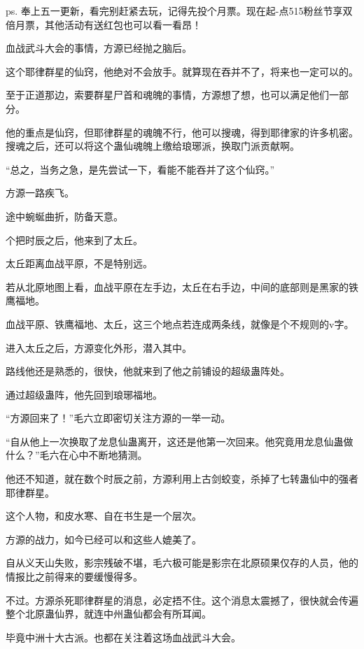 
\begin{this_body}

ps. 奉上五一更新，看完别赶紧去玩，记得先投个月票。现在起-点515粉丝节享双倍月票，其他活动有送红包也可以看一看昂！

血战武斗大会的事情，方源已经抛之脑后。

这个耶律群星的仙窍，他绝对不会放手。就算现在吞并不了，将来也一定可以的。

至于正道那边，索要群星尸首和魂魄的事情，方源想了想，也可以满足他们一部分。

他的重点是仙窍，但耶律群星的魂魄不行，他可以搜魂，得到耶律家的许多机密。搜魂之后，还可以将这个蛊仙魂魄上缴给琅琊派，换取门派贡献啊。

“总之，当务之急，是先尝试一下，看能不能吞并了这个仙窍。”

方源一路疾飞。

途中蜿蜒曲折，防备天意。

个把时辰之后，他来到了太丘。

太丘距离血战平原，不是特别远。

若从北原地图上看，血战平原在左手边，太丘在右手边，中间的底部则是黑家的铁鹰福地。

血战平原、铁鹰福地、太丘，这三个地点若连成两条线，就像是个不规则的v字。

进入太丘之后，方源变化外形，潜入其中。

路线他还是熟悉的，很快，他就来到了他之前铺设的超级蛊阵处。

通过超级蛊阵，他先回到琅琊福地。

“方源回来了！”毛六立即密切关注方源的一举一动。

“自从他上一次换取了龙息仙蛊离开，这还是他第一次回来。他究竟用龙息仙蛊做什么？”毛六在心中不断地猜测。

他还不知道，就在数个时辰之前，方源利用上古剑蛟变，杀掉了七转蛊仙中的强者耶律群星。

这个人物，和皮水寒、自在书生是一个层次。

方源的战力，如今已经可以和这些人媲美了。

自从义天山失败，影宗残破不堪，毛六极可能是影宗在北原硕果仅存的人员，他的情报比之前得来的要缓慢得多。

不过。方源杀死耶律群星的消息，必定捂不住。这个消息太震撼了，很快就会传遍整个北原蛊仙界，就连中州蛊仙都会有所耳闻。

毕竟中洲十大古派。也都在关注着这场血战武斗大会。


\end{this_body}

